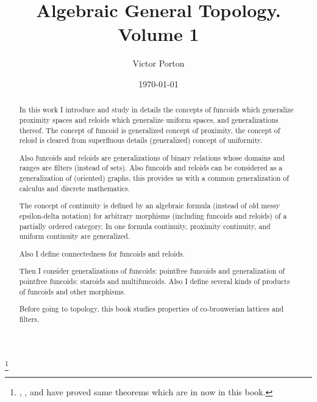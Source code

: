 \documentclass[a4paper,oneside,english,reqno]{amsbook}
\numberwithin{section}{chapter}
\begin{document}
\title{Algebraic General Topology. Volume 1}


\author{Victor Porton}






\date{\today}


\thanks{, , and  have proved same theorems which are in now in this book.}
\begin{abstract}
In this work I introduce and study in details the concepts of funcoids
which generalize proximity spaces and reloids which generalize uniform
spaces, and generalizations thereof. The concept of funcoid is generalized
concept of proximity, the concept of reloid is cleared from superfluous
details (generalized) concept of uniformity. 

Also funcoids and reloids are generalizations of binary relations
whose domains and ranges are filters (instead of sets). Also funcoids
and reloids can be considered as a generalization of (oriented) graphs,
this provides us with a common generalization of calculus and discrete
mathematics.

The concept of continuity is defined by an algebraic formula (instead
of old messy epsilon-delta notation) for arbitrary morphisms (including
funcoids and reloids) of a partially ordered category. In one formula
continuity, proximity continuity, and uniform continuity are generalized.

Also I define connectedness for funcoids and reloids.

Then I consider generalizations of funcoids: pointfree funcoids and
generalization of pointfree funcoids: staroids and multifuncoids.
Also I define several kinds of products of funcoids and other morphisms.

Before going to topology, this book studies properties of co-brouwerian
lattices and filters.
\end{abstract}





\maketitle
\end{document}
